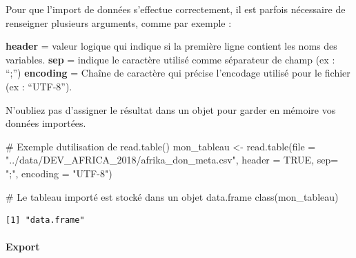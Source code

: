 \documentclass[
  letterpaper,
  DIV=11,
  numbers=noendperiod]{scrartcl}
\let\oldparagraph\paragraph
\renewcommand{\paragraph}[1]{\oldparagraph{#1}\mbox{}}
\newenvironment{Shaded}{\begin{snugshade}}{\end{snugshade}}
\newcommand{\AttributeTok}[1]{\textcolor[rgb]{0.40,0.45,0.13}{#1}}
\newcommand{\CommentTok}[1]{\textcolor[rgb]{0.37,0.37,0.37}{#1}}
\newcommand{\ConstantTok}[1]{\textcolor[rgb]{0.56,0.35,0.01}{#1}}
\newcommand{\FunctionTok}[1]{\textcolor[rgb]{0.28,0.35,0.67}{#1}}
\newcommand{\NormalTok}[1]{\textcolor[rgb]{0.00,0.23,0.31}{#1}}
\newcommand{\OtherTok}[1]{\textcolor[rgb]{0.00,0.23,0.31}{#1}}
\newcommand{\StringTok}[1]{\textcolor[rgb]{0.13,0.47,0.30}{#1}}
\begin{document}
Pour que l'import de données s'effectue correctement, il est parfois
nécessaire de renseigner plusieurs arguments, comme par exemple :

\textbf{header} = valeur logique qui indique si la première ligne
contient les noms des variables. \textbf{sep} = indique le caractère
utilisé comme séparateur de champ (ex : ``;'') \textbf{encoding} =
Chaîne de caractère qui précise l'encodage utilisé pour le fichier (ex :
``UTF-8'').

\begin{tcolorbox}[enhanced jigsaw, colframe=quarto-callout-important-color-frame, bottomtitle=1mm, colback=white, leftrule=.75mm, breakable, left=2mm, titlerule=0mm, toptitle=1mm, arc=.35mm, title=\textcolor{quarto-callout-important-color}{\faExclamation}\hspace{0.5em}{Important}, rightrule=.15mm, bottomrule=.15mm, toprule=.15mm, colbacktitle=quarto-callout-important-color!10!white, opacitybacktitle=0.6, opacityback=0, coltitle=black]

N'oubliez pas d'assigner le résultat dans un objet pour garder en
mémoire vos données importées.

\end{tcolorbox}

\begin{Shaded}
\begin{Highlighting}[]
\CommentTok{\# Exemple d\textquotesingle{}utilisation de read.table()}
\NormalTok{mon\_tableau  }\OtherTok{\textless{}{-}} \FunctionTok{read.table}\NormalTok{(}\AttributeTok{file =} \StringTok{"../data/DEV\_AFRICA\_2018/afrika\_don\_meta.csv"}\NormalTok{, }
                           \AttributeTok{header =} \ConstantTok{TRUE}\NormalTok{,}
                           \AttributeTok{sep=} \StringTok{";"}\NormalTok{,}
                           \AttributeTok{encoding =} \StringTok{"UTF{-}8"}\NormalTok{)}


\CommentTok{\# Le tableau importé est stocké dans un objet data.frame}
\FunctionTok{class}\NormalTok{(mon\_tableau)}
\end{Highlighting}
\end{Shaded}

\begin{verbatim}
[1] "data.frame"
\end{verbatim}

\hypertarget{export}{%
\paragraph{Export}\label{export}}
\end{document}
